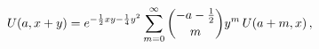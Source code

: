 \[\mathop{U\/}\nolimits\!\left(a,x+y\right)=e^{-\frac{1}{2}xy-\frac{1}{4}y^{2}}%
\sum_{m=0}^{\infty}\binom{-a-\tfrac{1}{2}}{m}y^{m}\mathop{U\/}\nolimits\!\left%
(a+m,x\right),\]